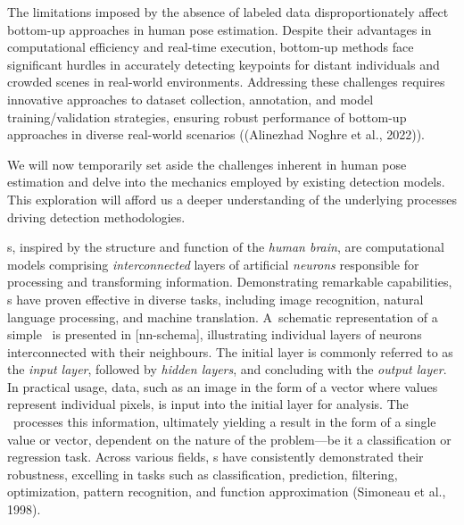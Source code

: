 The limitations imposed by the absence of labeled data disproportionately affect bottom-up approaches in human pose estimation. Despite their advantages in computational efficiency and real-time execution, bottom-up methods face significant hurdles in accurately detecting keypoints for distant individuals and crowded scenes in real-world environments. Addressing these challenges requires innovative approaches to dataset collection, annotation, and model training/validation strategies, ensuring robust performance of bottom-up approaches in diverse real-world scenarios ((\scc Alinezhad Noghre et al., 2022)).

We will now temporarily set aside the challenges inherent in human pose estimation and delve into the mechanics employed by existing detection models. This exploration will afford us a deeper understanding of the underlying processes driving detection methodologies.

\NN\-s, inspired by the structure and function of the {\em human brain}, are computational models comprising {\em interconnected} layers of artificial {\em neurons} responsible for processing and transforming information. Demonstrating remarkable capabilities, \NN\-s have proven effective in diverse tasks, including image recognition, natural language processing, and machine translation. A~schematic representation of a simple \NN\ is presented in [nn-schema], illustrating individual layers of neurons interconnected with their neighbours. The initial layer is commonly referred to as the {\em input layer}, followed by {\em hidden layers}, and concluding with the {\em output layer}. In practical usage, data, such as an image in the form of a vector where values represent individual pixels, is input into the initial layer for analysis. The \NN\ processes this information, ultimately yielding a result in the form of a single value or vector, dependent on the nature of the problem—be it a classification or regression task. Across various fields, \NN\-s have consistently demonstrated their robustness, excelling in tasks such as classification, prediction, filtering, optimization, pattern recognition, and function approximation (\scc Simoneau et al., 1998).


